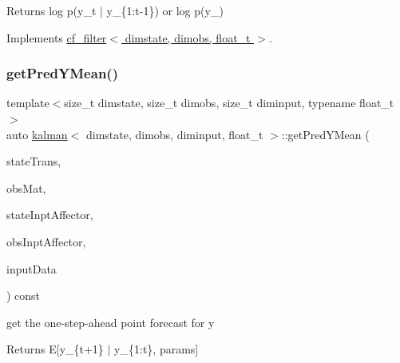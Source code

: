 \begin{DoxyReturn}{Returns}
log p(y\+\_\+t $\vert$ y\+\_\+\{1\+:t-\/1\}) or log p(y\+\_) 
\end{DoxyReturn}


Implements \hyperlink{classcf__filter_a11b26307172bf94b8075ed2cdb8fc09c}{cf\+\_\+filter$<$ dimstate, dimobs, float\+\_\+t $>$}.

\mbox{\label{classkalman_a9578d69543a3e756275e61a69ad9f1ac}} 
\subsubsection{\texorpdfstring{get\+Pred\+Y\+Mean()}{getPredYMean()}}
{\footnotesize\ttfamily template$<$size\+\_\+t dimstate, size\+\_\+t dimobs, size\+\_\+t diminput, typename float\+\_\+t $>$ \\
auto \hyperlink{classkalman}{kalman}$<$ dimstate, dimobs, diminput, float\+\_\+t $>$\+::get\+Pred\+Y\+Mean (\begin{DoxyParamCaption}\item[{const \hyperlink{classkalman_a581550d9aba33245fb496b22a834831c}{ss\+Mat} \&}]{state\+Trans,  }\item[{const \hyperlink{classkalman_a13c0f71cc509326e1493982e9f23ebfc}{obs\+State\+Size\+Mat} \&}]{obs\+Mat,  }\item[{const \hyperlink{classkalman_ab024c795f585385ee14aea92a5dccfbc}{si\+Mat} \&}]{state\+Inpt\+Affector,  }\item[{const \hyperlink{classkalman_a35298f18f0b699f700e2d55d94bf54fc}{oi\+Mat} \&}]{obs\+Inpt\+Affector,  }\item[{const \hyperlink{classkalman_abc570ce1b06e8a96a334f9226dfbce77}{isv} \&}]{input\+Data }\end{DoxyParamCaption}) const}



get the one-\/step-\/ahead point forecast for y 

\begin{DoxyReturn}{Returns}
E\mbox{[}y\+\_\+\{t+1\} $\vert$ y\+\_\+\{1\+:t\}, params\mbox{]} 
\end{DoxyReturn}
\mbox{\label{classkalman_a029d34d75a517bc82d097bb9e289497f}} 
